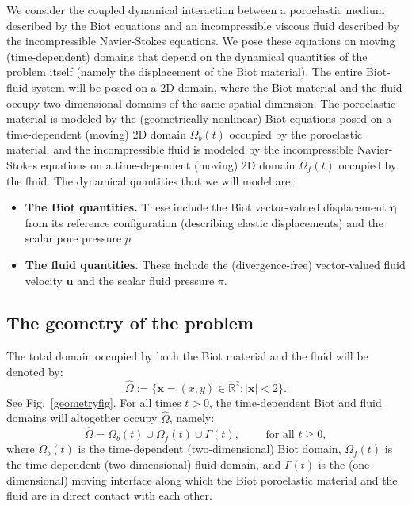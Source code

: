 \documentclass[11pt]{article}
\newcommand{\bd}{\boldsymbol}
\theoremstyle{definition}
\begin{document}
We consider the coupled dynamical interaction between a poroelastic medium described by the Biot equations and an incompressible viscous fluid described by the incompressible Navier-Stokes equations. We pose these equations on moving (time-dependent) domains that depend on the dynamical quantities of the problem itself (namely the displacement of the Biot material). The entire Biot-fluid system will be posed on a 2D domain, where the Biot material and the fluid occupy two-dimensional domains of the same spatial dimension. The poroelastic material is modeled by the (geometrically nonlinear) Biot equations posed on a time-dependent (moving) 2D domain $\Omega_{b}(t)$ occupied by the poroelastic material, and the incompressible fluid is modeled by the incompressible Navier-Stokes equations on a time-dependent (moving) 2D domain $\Omega_{f}(t)$ occupied by the fluid. The dynamical quantities that we will model are:
\begin{itemize}
\item \textbf{The Biot quantities.} These include the Biot vector-valued displacement $\bd{\eta}$ from its reference configuration (describing elastic displacements) and the scalar pore pressure $p$. 
\item \textbf{The fluid quantities.} These include the (divergence-free) vector-valued fluid velocity $\bd{u}$ and the scalar fluid pressure $\pi$.  
\end{itemize}

\subsection{The geometry of the problem}

The total domain occupied by both the Biot material and the fluid will be denoted by:
\begin{equation*}
\hat{\Omega} := \{\bd{x} = (x, y) \in \mathbb{R}^{2} : |\bd{x}| < 2\}.
\end{equation*}
See Fig.~\ref{geometryfig}. 
For all times $t > 0$, the time-dependent Biot and fluid domains will altogether occupy $\hat{\Omega}$, namely:
\begin{equation*}
\hat{\Omega} = \Omega_{b}(t) \cup \Omega_{f}(t) \cup \Gamma(t), \qquad \text{ for all } t \ge 0,
\end{equation*}
where $\Omega_{b}(t)$ is the time-dependent (two-dimensional) Biot domain, $\Omega_{f}(t)$ is the time-dependent (two-dimensional) fluid domain, and $\Gamma(t)$ is the (one-dimensional) moving interface along which the Biot poroelastic material and the fluid are in direct contact with each other.
\end{document}
